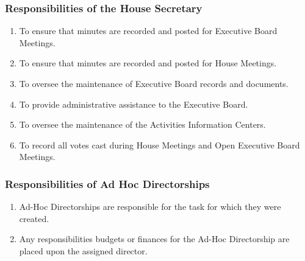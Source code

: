 \documentclass{article}
\newcommand{\asubsection}[1]{\subsubsection{#1} \label{#1}}
\begin{document}
\asubsection{Responsibilities of the House Secretary}
\begin{enumerate}
	\item To ensure that minutes are recorded and posted for Executive Board Meetings.
	\item To ensure that minutes are recorded and posted for House Meetings.
	\item To oversee the maintenance of Executive Board records and documents.
	\item To provide administrative assistance to the Executive Board.
	\item To oversee the maintenance of the Activities Information Centers.
	\item To record all votes cast during House Meetings and Open Executive Board Meetings.
\end{enumerate}

\asubsection{Responsibilities of Ad Hoc Directorships}
\begin{enumerate}
	\item Ad-Hoc Directorships are responsible for the task for which they were created.
	\item Any responsibilities budgets or finances for the Ad-Hoc Directorship are placed upon the assigned director.
\end{enumerate}
\end{document}
